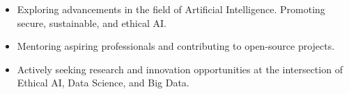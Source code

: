 \begin{itemize}[itemsep=-3pt, left=0pt]
    \item Exploring advancements in the field of Artificial Intelligence. Promoting secure, sustainable, and ethical AI.
    \item Mentoring aspiring professionals and contributing to open-source projects.
    \item Actively seeking research and innovation opportunities at the intersection of Ethical AI, Data Science, and Big Data.
\end{itemize}
\vspace{-12pt}

